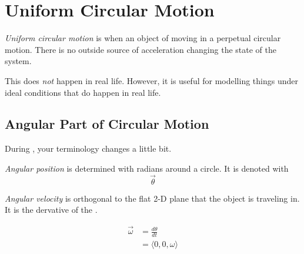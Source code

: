 \section{Uniform Circular Motion}\label{sec:Uniform Circular Motion}
\begin{definition}\label{def:Uniform Circular Motion}
  \emph{Uniform circular motion} is when an object of moving in a perpetual circular motion.
  There is no outside source of acceleration changing the state of the system.
  \begin{remark}
    This does \emph{not} happen in real life.
    However, it is useful for modelling things under ideal conditions that do happen in real life.
  \end{remark}
\end{definition}

\subsection{Angular Part of Circular Motion}\label{subsec:Angular Circular Motion}
During , your terminology changes a little bit.
\begin{definition}\label{def:Angular Position}
  \emph{Angular position} is determined with radians around a circle.
  It is denoted with \[ \vec{\theta} \]
\end{definition}

\begin{definition}\label{def:Angular Velocity}
  \emph{Angular velocity} is orthogonal to the flat 2-D plane that the object is traveling in.
  It is the dervative of the .

  \begin{equation}\label{eq:Angular Velocity}
    \begin{aligned}
      \vec{\omega} &= \frac{d \theta}{dt} \\
      &= \langle 0, 0, \omega \rangle \\
    \end{aligned}
  \end{equation}
\end{definition}

